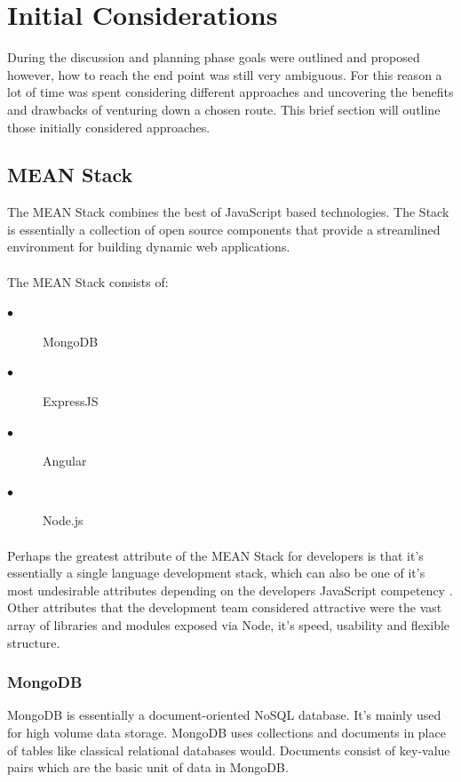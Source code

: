 \section{Initial Considerations}
During the discussion and planning phase goals were outlined and proposed however, how to reach the end point was still very ambiguous. For this reason a lot of time was spent considering different approaches and uncovering the benefits and drawbacks of venturing down a chosen route. This brief section will outline those initially considered approaches.
\subsection{MEAN Stack}
The MEAN Stack combines the best of JavaScript based technologies. The Stack is essentially a collection of open source components that provide a streamlined environment for building dynamic web applications. 

\paragraph{}
The MEAN Stack consists of:

\begin{description}
  \item[$\bullet$] MongoDB
  \item[$\bullet$] ExpressJS
  \item[$\bullet$] Angular
  \item[$\bullet$] Node.js
\end{description}

\paragraph{}
Perhaps the greatest attribute of the MEAN Stack for developers is that it's essentially a single language development stack, which can also be one of it's most undesirable attributes depending on the developers JavaScript competency \cite{MEAN_STACK}. Other attributes that the development team considered attractive were the vast array of libraries and modules exposed via Node, it's speed, usability and flexible structure. 

\subsubsection{MongoDB}
MongoDB is essentially a document-oriented NoSQL database. It's mainly used for high volume data storage. MongoDB uses collections and documents in place of tables like classical relational databases would. Documents consist of key-value pairs which are the basic unit of data in MongoDB.

